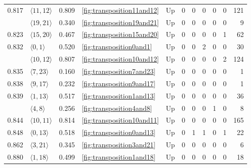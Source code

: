 \documentclass{article}
\begin{document}
\begin{center}
\begin{tabular}{lllllrrrrrr}
\cline{1-11} \cline{2-11} \cline{3-11} \cline{4-11}
\multirow[t]{2}{*}{0.817} & $\langle11, 12\rangle$ & 0.809 & \ref{fig:transposition11and12} & Up & 0 & 0 & 0 & 0 & 0 & 121 \\
\cline{2-11} \cline{3-11} \cline{4-11}
 & $\langle19, 21\rangle$ & 0.340 & \ref{fig:transposition19and21} & Up & 0 & 0 & 0 & 0 & 0 & 9 \\
\cline{1-11} \cline{2-11} \cline{3-11} \cline{4-11}
0.823 & $\langle15, 20\rangle$ & 0.467 & \ref{fig:transposition15and20} & Up & 0 & 0 & 0 & 0 & 1 & 62 \\
\cline{1-11} \cline{2-11} \cline{3-11} \cline{4-11}
\multirow[t]{2}{*}{0.832} & $\langle0, 1\rangle$ & 0.520 & \ref{fig:transposition0and1} & Up & 0 & 0 & 2 & 0 & 0 & 30 \\
\cline{2-11} \cline{3-11} \cline{4-11}
 & $\langle10, 12\rangle$ & 0.807 & \ref{fig:transposition10and12} & Up & 0 & 0 & 0 & 0 & 2 & 124 \\
\cline{1-11} \cline{2-11} \cline{3-11} \cline{4-11}
0.835 & $\langle7, 23\rangle$ & 0.160 & \ref{fig:transposition7and23} & Up & 0 & 0 & 0 & 0 & 0 & 1 \\
\cline{1-11} \cline{2-11} \cline{3-11} \cline{4-11}
0.838 & $\langle9, 17\rangle$ & 0.232 & \ref{fig:transposition9and17} & Up & 0 & 0 & 0 & 0 & 0 & 1 \\
\cline{1-11} \cline{2-11} \cline{3-11} \cline{4-11}
\multirow[t]{2}{*}{0.839} & $\langle1, 13\rangle$ & 0.517 & \ref{fig:transposition1and13} & Up & 0 & 0 & 0 & 0 & 0 & 36 \\
\cline{2-11} \cline{3-11} \cline{4-11}
 & $\langle4, 8\rangle$ & 0.256 & \ref{fig:transposition4and8} & Up & 0 & 0 & 0 & 1 & 0 & 8 \\
\cline{1-11} \cline{2-11} \cline{3-11} \cline{4-11}
0.844 & $\langle10, 11\rangle$ & 0.814 & \ref{fig:transposition10and11} & Up & 0 & 0 & 0 & 0 & 0 & 165 \\
\cline{1-11} \cline{2-11} \cline{3-11} \cline{4-11}
0.848 & $\langle0, 13\rangle$ & 0.518 & \ref{fig:transposition0and13} & Up & 0 & 1 & 1 & 0 & 1 & 22 \\
\cline{1-11} \cline{2-11} \cline{3-11} \cline{4-11}
0.862 & $\langle3, 21\rangle$ & 0.345 & \ref{fig:transposition3and21} & Up & 0 & 0 & 0 & 0 & 0 & 6 \\
\cline{1-11} \cline{2-11} \cline{3-11} \cline{4-11}
\multirow[t]{3}{*}{0.880} & $\langle1, 18\rangle$ & 0.499 & \ref{fig:transposition1and18} & Up & 0 & 0 & 0 & 0 & 0 & 18 \\
\cline{2-11} \cline{3-11} \cline{4-11}

\end{tabular}
\end{center}
\end{document}
